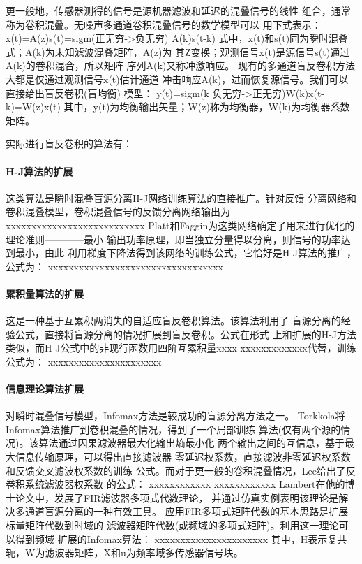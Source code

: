     更一般地，传感器测得的信号是源机器滤波和延迟的混叠信号的线性
组合，通常称为卷积混叠。无噪声多通道卷积混叠信号的数学模型可以
用下式表示：
      x(t)=A(z)s(t)=sigm(正无穷->负无穷) A(k)s(t-k)
式中，x(t)和s(t)同为瞬时混叠式；A(k)为未知滤波混叠矩阵，A(z)为
其Z变换；观测信号x(t)是源信号s(t)通过A(k)的卷积混合，所以矩阵
序列{A(k)}又称冲激响应。
    现有的多通道盲反卷积方法大都是仅通过观测信号x(t)估计通道
冲击响应{A(k)}，进而恢复源信号。我们可以直接给出盲反卷积(盲均衡)
模型：
      y(t)=sigm(k 负无穷->正无穷)W(k)x(t-k)=W(z)x(t)
其中，y(t)为均衡输出矢量；W(z)称为均衡器，W(k)为均衡器系数矩阵。

实际进行盲反卷积的算法有：

\paragraph*{H-J算法的扩展}
这类算法是瞬时混叠盲源分离H-J网络训练算法的直接推广。针对反馈
分离网络和卷积混叠模型，卷积混叠信号的反馈分离网络输出为
    xxxxxxxxxxxxxxxxxxxxxxxxxxx
	Platt和Faggin为这类网络确定了用来进行优化的理论准则————最小
输出功率原理，即当独立分量得以分离，则信号的功率达到最小，由此
利用梯度下降法得到该网络的训练公式，它恰好是H-J算法的推广，公式为：
          xxxxxxxxxxxxxxxxxxxxxxxxxxxxxxxxxx
\paragraph*{累积量算法的扩展}
这是一种基于互累积两消失的自适应盲反卷积算法。该算法利用了
盲源分离的经验公式，直接将盲源分离的情况扩展到盲反卷积。公式在形式
上和扩展的H-J方法类似，而H-J公式中的非现行函数用四阶互累积量xxxx
xxxxxxxxxxxxx代替，训练公式为：
     xxxxxxxxxxxxxxxxxxxxxx
\paragraph*{信息理论算法扩展}
对瞬时混叠信号模型，Infomax方法是较成功的盲源分离方法之一。
Torkkola将Infomax算法推广到卷积混叠的情况，得到了一个局部训练
算法(仅有两个源的情况)。该算法通过因果滤波器最大化输出熵最小化
两个输出之间的互信息，基于最大信息传输原理，可以得出直接滤波器
零延迟权系数，直接滤波非零延迟权系数和反馈交叉滤波权系数的训练
公式。而对于更一般的卷积混叠情况，Lee给出了反卷积系统滤波器权系数
的公式：
    xxxxxxxxxxxx
	xxxxxxxxxxxx
	Lambert在他的博士论文中，发展了FIR滤波器多项式代数理论，
并通过仿真实例表明该理论是解决多通道盲源分离的一种有效工具。
应用FIR多项式矩阵代数的基本思路是扩展标量矩阵代数到时域的
滤波器矩阵代数(或频域的多项式矩阵)。利用这一理论可以得到频域
扩展的Infomax算法：
      xxxxxxxxxxxxxxxxxxxxxx
其中，H表示复共轭，W为滤波器矩阵，X和u为频率域多传感器信号块。

